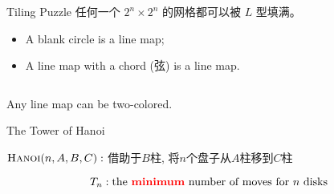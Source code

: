 
\begin{frame}{}
  \begin{exampleblock}{Tiling Puzzle}
    任何一个 $2^{n} \times 2^{n}$ 的网格都可以被 $L$ 型填满。
  \end{exampleblock}

\end{frame}

\begin{frame}{}
  \begin{definition}
    \begin{itemize}
      \item A blank circle is a line map;
      \item A line map with a chord (弦) is a line map.
    \end{itemize}
  \end{definition}

  \begin{columns}
  \end{columns}

  \pause
  \vspace{-0.30cm}
  \begin{theorem}
    Any line map can be two-colored.
  \end{theorem}
\end{frame}

\begin{frame}{}
  \begin{exampleblock}{The Tower of Hanoi}

    \vspace{0.30cm}
    \begin{center}
      $\textsc{Hanoi}(n, A, B, C):$ 借助于$B$柱, 将$n$个盘子从$A$柱移到$C$柱
    \end{center}
  \end{exampleblock}

  \pause
  \[
    T_{n}: \text{the \textcolor{red}{\bf minimum} number of moves for $n$ disks}
  \]
\end{frame}

